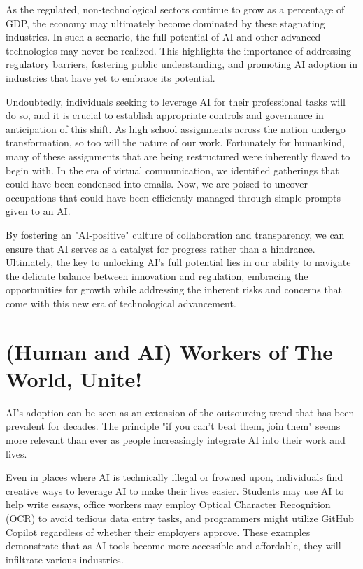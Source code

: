 As the regulated, non-technological sectors continue to grow as a percentage of GDP, the economy may ultimately become dominated by these stagnating industries. In such a scenario, the full potential of AI and other advanced technologies may never be realized. This highlights the importance of addressing regulatory barriers, fostering public understanding, and promoting AI adoption in industries that have yet to embrace its potential.

Undoubtedly, individuals seeking to leverage AI for their professional tasks will do so, and it is crucial to establish appropriate controls and governance in anticipation of this shift. As high school assignments across the nation undergo transformation, so too will the nature of our work. Fortunately for humankind, many of these assignments that are being restructured were inherently flawed to begin with. In the era of virtual communication, we identified gatherings that could have been condensed into emails. Now, we are poised to uncover occupations that could have been efficiently managed through simple prompts given to an AI.

By fostering an "AI-positive" culture of collaboration and transparency, we can ensure that AI serves as a catalyst for progress rather than a hindrance. Ultimately, the key to unlocking AI's full potential lies in our ability to navigate the delicate balance between innovation and regulation, embracing the opportunities for growth while addressing the inherent risks and concerns that come with this new era of technological advancement.

\section{(Human and AI) Workers of The World, Unite!}

AI's adoption can be seen as an extension of the outsourcing trend that has been prevalent for decades. The principle "if you can't beat them, join them" seems more relevant than ever as people increasingly integrate AI into their work and lives.

Even in places where AI is technically illegal or frowned upon, individuals find creative ways to leverage AI to make their lives easier. Students may use AI to help write essays, office workers may employ Optical Character Recognition (OCR) to avoid tedious data entry tasks, and programmers might utilize GitHub Copilot regardless of whether their employers approve. These examples demonstrate that as AI tools become more accessible and affordable, they will infiltrate various industries.

